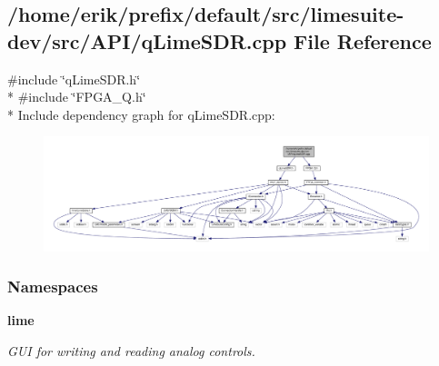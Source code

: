 \subsection{/home/erik/prefix/default/src/limesuite-\/dev/src/\+A\+P\+I/q\+Lime\+S\+DR.cpp File Reference}
\label{qLimeSDR_8cpp}
{\ttfamily \#include \char`\"{}q\+Lime\+S\+D\+R.\+h\char`\"{}}\\*
{\ttfamily \#include \char`\"{}F\+P\+G\+A\+\_\+\+Q.\+h\char`\"{}}\\*
Include dependency graph for q\+Lime\+S\+D\+R.\+cpp\+:
\nopagebreak
\begin{figure}[H]
\begin{center}
\leavevmode
\includegraphics[width=350pt]{d1/d64/qLimeSDR_8cpp__incl}
\end{center}
\end{figure}
\subsubsection*{Namespaces}
\begin{DoxyCompactItemize}
\item 
 {\bf lime}
\begin{DoxyCompactList}\small\item\em G\+UI for writing and reading analog controls. \end{DoxyCompactList}\end{DoxyCompactItemize}
